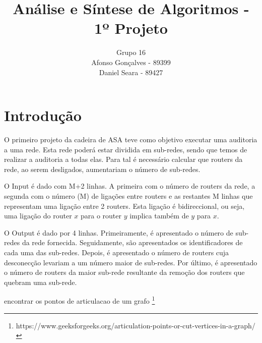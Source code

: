 \documentclass[12pt]{article}
\begin{document}
\title{Análise e Síntese de Algoritmos - 1º Projeto}
\author{Grupo 16 \\ Afonso Gonçalves - 89399 \\ Daniel Seara - 89427}
\date{}
\maketitle


\thispagestyle{fancy}


\section{Introdução}

O primeiro projeto da cadeira de ASA teve como objetivo executar uma auditoria a uma rede. Esta rede poderá estar dividida em sub-redes, 
sendo que temos de realizar a auditoria a todas elas. Para tal é necessário calcular que routers da rede, ao serem desligados, aumentariam o número de
sub-redes.\par

O Input é dado com M+2 linhas. A primeira com o número de routers da rede, a segunda com o número (M) de ligações entre routers e as restantes M linhas que 
representam uma ligação entre 2 routers. Esta ligação é bidireccional, ou seja, uma ligação do router $x$ para o router $y$ implica também de 
$y$ para $x$.\par

O Output é dado por 4 linhas. Primeiramente, é apresentado o número de sub-redes da rede fornecida. Seguidamente, são apresentados os identificadores de cada 
uma das sub-redes. Depois, é apresentado o número de routers cuja desconecção levariam a um número maior de sub-redes. Por último, é apresentado o número de routers 
da maior sub-rede resultante da remoção dos routers que quebram uma sub-rede.\par

encontrar os pontos de articulacao de um grafo \footnote{https://www.geeksforgeeks.org/articulation-points-or-cut-vertices-in-a-graph/
}
\end{document}
